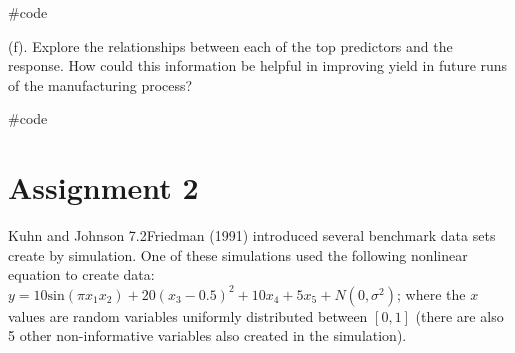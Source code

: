 \documentclass[openany]{report}
\newenvironment{Shaded}{\begin{snugshade}}{\end{snugshade}}
\newcommand{\CommentTok}[1]{\textcolor[rgb]{0.50,0.62,0.50}{#1}}
\newcommand{\DataTypeTok}[1]{\textcolor[rgb]{0.87,0.87,0.75}{#1}}
\newcommand{\DecValTok}[1]{\textcolor[rgb]{0.86,0.86,0.80}{#1}}
\newcommand{\KeywordTok}[1]{\textcolor[rgb]{0.94,0.87,0.69}{#1}}
\newcommand{\NormalTok}[1]{\textcolor[rgb]{0.80,0.80,0.80}{#1}}
\newcommand{\OperatorTok}[1]{\textcolor[rgb]{0.94,0.94,0.82}{#1}}
\newcommand{\StringTok}[1]{\textcolor[rgb]{0.80,0.58,0.58}{#1}}
\begin{document}
\begin{Shaded}
\begin{Highlighting}[]
\CommentTok{#code}
\end{Highlighting}
\end{Shaded}

\begin{subquestion}{(f).} Explore the relationships between each of the top predictors and the response. How could this information be helpful in improving yield in future runs of the manufacturing process?
\end{subquestion}

\begin{Shaded}
\begin{Highlighting}[]
\CommentTok{#code}
\end{Highlighting}
\end{Shaded}

\hypertarget{AS-2}{%
\chapter*{Assignment 2}\label{AS-2}}


\begin{question}{Kuhn and Johnson 7.2}Friedman (1991) introduced several benchmark data sets create by simulation. One of these simulations used the following nonlinear equation to create data: $y = 10\text{sin}(\pi x_1 x_2)+20(x_3-0.5)^2+10x_4+5x_5+N(0,\sigma^2)$; where the $x$ values are random variables uniformly distributed between $[0, 1]$ (there are also 5 other non-informative variables also created in the simulation). \end{question}

\begin{Shaded}
\end{Shaded}
\end{document}
